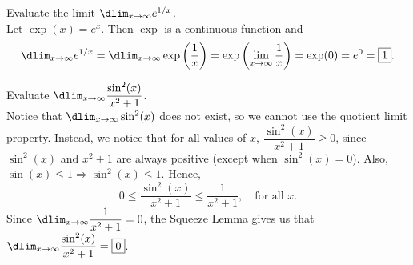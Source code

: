 \documentclass{book}
\begin{document}
\begin{Exam} Evaluate the limit $\dlim_{x\to \infty} e^{1/x}$.\\

Let $\exp(x) = e^x$. Then $\exp$ is a continuous function and 
\[\dlim_{x\to \infty} e^{1/x} = \dlim_{x\to \infty} \exp\left(\dfrac{1}{x}\right) = \exp\left(\lim_{x\to \infty} \dfrac{1}{x}\right) = \exp(0) = e^0 = \fbox{$1$}. \]
\end{Exam}\vs

\begin{Exam}Evaluate $\dlim_{x\to \infty} \dfrac{\sin^2(x)}{x^2+1}$.\\

Notice that $\dlim_{x\to \infty} \sin^2(x) $ does not exist, so we cannot use the quotient limit property. Instead, we notice that for all values of $x$, $\dfrac{\sin^2(x)}{x^2+1} \ge 0$, since $\sin^2(x)$ and $x^2+1$ are always positive (except when $\sin^2(x) = 0$). Also, $\sin (x) \le 1 \Longrightarrow \sin^2(x) \le 1$. Hence, \[0 \le \dfrac{\sin^2(x)}{x^2+1} \le \dfrac{1}{x^2+1}, \quad\text{for all } x.\] Since $\dlim_{x\to \infty} \dfrac{1}{x^2+1} = 0$, the Squeeze Lemma gives us that $\dlim_{x\to \infty} \dfrac{\sin^2(x)}{x^2+1} = \fbox{$0$}$. \end{Exam}\vs
\end{document}
